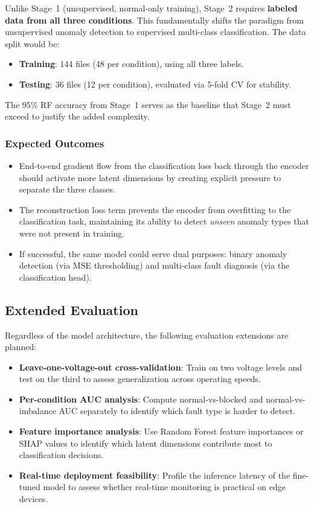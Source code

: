 \documentclass[12pt, a4paper]{article}
\begin{document}
Unlike Stage~1 (unsupervised, normal-only training), Stage~2 requires \textbf{labeled data from all three conditions}. This fundamentally shifts the paradigm from unsupervised anomaly detection to supervised multi-class classification. The data split would be:

\begin{itemize}
    \item \textbf{Training}: 144 files (48 per condition), using all three labels.
    \item \textbf{Testing}: 36 files (12 per condition), evaluated via 5-fold CV for stability.
\end{itemize}

The 95\% RF accuracy from Stage~1 serves as the baseline that Stage~2 must exceed to justify the added complexity.

\subsubsection{Expected Outcomes}

\begin{itemize}
    \item End-to-end gradient flow from the classification loss back through the encoder should activate more latent dimensions by creating explicit pressure to separate the three classes.
    \item The reconstruction loss term prevents the encoder from overfitting to the classification task, maintaining its ability to detect \emph{unseen} anomaly types that were not present in training.
    \item If successful, the same model could serve dual purposes: binary anomaly detection (via MSE thresholding) and multi-class fault diagnosis (via the classification head).
\end{itemize}

\subsection{Extended Evaluation}

Regardless of the model architecture, the following evaluation extensions are planned:
\begin{itemize}
    \item \textbf{Leave-one-voltage-out cross-validation}: Train on two voltage levels and test on the third to assess generalization across operating speeds.
    \item \textbf{Per-condition AUC analysis}: Compute normal-vs-blocked and normal-vs-imbalance AUC separately to identify which fault type is harder to detect.
    \item \textbf{Feature importance analysis}: Use Random Forest feature importances or SHAP values to identify which latent dimensions contribute most to classification decisions.
    \item \textbf{Real-time deployment feasibility}: Profile the inference latency of the fine-tuned model to assess whether real-time monitoring is practical on edge devices.
\end{itemize}
\end{document}
